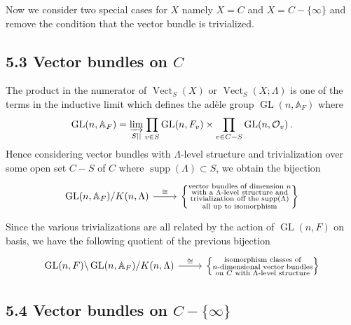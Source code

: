 \documentclass[12pt,a4paper]{article}
\theoremstyle{plain}
\theoremstyle{definition}
\theoremstyle{remark}
\DeclareMathOperator{\GL}{GL}
\DeclareMathOperator{\supp}{supp}
\DeclareMathOperator{\Vect}{Vect}
\begin{document}
Now we consider two special cases for $X$ namely $X = C$ and 
$X = C - \{\infty\}$ and remove the condition that the vector bundle is 
trivialized.

\subsection*{5.3 Vector bundles on $C$}

The product in the numerator of $\Vect_S(X)$ or $\Vect_S(X;\Lambda)$ is one of 
the terms in the inductive limit which defines the ad\`ele group 
$\GL(n,\mathbb{A}_F)$ where
\[
\GL(n,\mathbb{A}_F) = \varinjlim_{S ||} \prod_{v \in S} \GL(n,F_v) \times \prod_{v \in C-S} \GL(n,\mathcal{O}_v) \,.
\]
Hence considering vector bundles with $\Lambda$-level structure and 
trivialization over some open set $C - S$ of $C$ where 
$\supp(\Lambda) \subset S$, we obtain the bijection
\[
\begin{tikzcd}
\GL(n,\mathbb{A}_F)/K(n,\Lambda) \arrow[r, "\cong"] & \left\{\substack{\text{vector bundles of dimension $n$}\\\text{with a $\Lambda$-level structure and}\\\text{trivialization off the $\supp(\Lambda)$}\\\text{all up to isomorphism}}\right\}
\end{tikzcd}
\]
Since the various trivializations are all related by the action of 
$\GL(n,F)$ on basis, we have the following quotient of the previous bijection
\[
\begin{tikzcd}
\GL(n,F) \backslash \GL(n,\mathbb{A}_F)/K(n,\Lambda) \arrow[r, "\cong"] & \left\{\substack{\text{isomorphism classes of}\\\text{$n$-dimensional vector bundles}\\\text{on $C$ with $\Lambda$-level structure}}\right\}
\end{tikzcd}
\]

\subsection*{5.4 Vector bundles on $C - \{\infty\}$}
\end{document}
